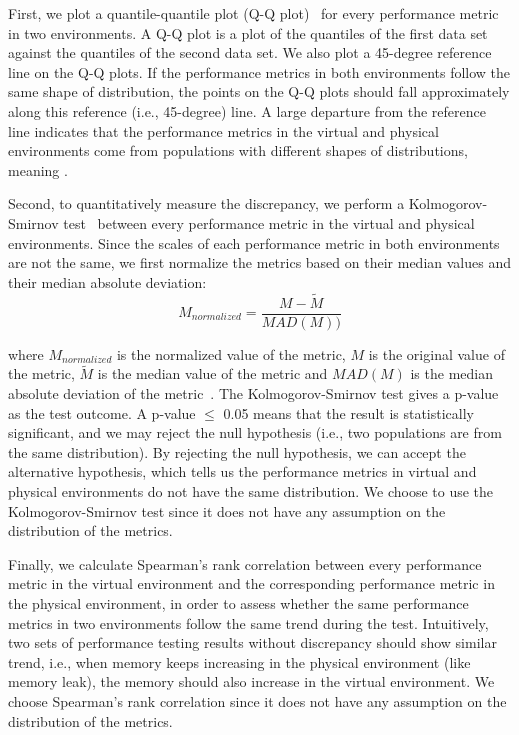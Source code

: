 First, we plot a quantile-quantile plot (Q-Q plot)~\cite{qqplots} for every performance metric in two environments. A Q-Q plot is a plot of the quantiles of the first data set against the quantiles of the second data set. We also plot a 45-degree reference line on the Q-Q plots. If the performance metrics in both environments follow the same shape of distribution, the points on the Q-Q plots should fall approximately along this reference (i.e., 45-degree) line. A large departure from the reference line indicates that the performance metrics in the virtual and physical environments come from populations with different shapes of distributions, meaning . 

Second, to quantitatively measure the discrepancy, we perform a Kolmogorov-Smirnov test~\cite{kstest} between every performance metric in the virtual and physical environments. Since the scales of each performance metric in both environments are not the same, we first normalize the metrics based on their median values and their median absolute deviation: 
\begin{equation}
	\label{equ:mad}
		M_{normalized}=\frac{M-\tilde{M}}{MAD(M))}		
\end{equation}
	
where $M_{normalized}$ is the normalized value of the metric, $M$ is the original value of the metric, $\tilde{M}$ is the median value of the metric and $MAD(M)$ is the median absolute deviation of the metric~\cite{walker1929studies}. The Kolmogorov-Smirnov test gives a p-value as the test outcome. A p-value $\leq$ 0.05 means that the result is statistically significant, and we may reject the null hypothesis (i.e., two populations are from the same distribution). By rejecting the null hypothesis, we can accept the alternative hypothesis, which tells us the performance metrics in virtual and physical environments do not have the same distribution. We choose to use the Kolmogorov-Smirnov test since it does not have any assumption on the distribution of the metrics.

Finally, we calculate Spearman's rank correlation between every performance metric in the virtual environment and the corresponding performance metric in the physical environment, in order to assess whether the same performance metrics in two environments follow the same trend during the test. Intuitively, two sets of performance testing results without discrepancy should show similar trend, i.e., when memory keeps increasing in the physical environment (like memory leak), the memory should also increase in the virtual environment. We choose Spearman's rank correlation since it does not have any assumption on the distribution of the metrics. 

